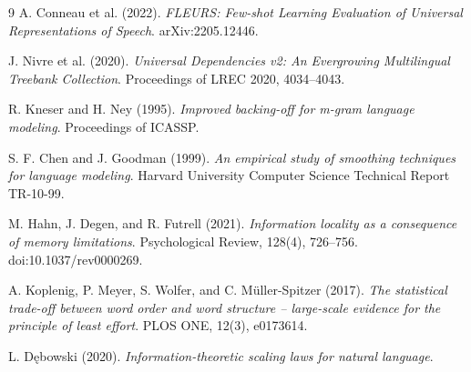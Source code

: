 \documentclass[11pt]{article}
\begin{document}
\begin{thebibliography}{9}
A. Conneau et al. (2022). \textit{FLEURS: Few-shot Learning Evaluation of Universal Representations of Speech}. arXiv:2205.12446.

J. Nivre et al. (2020). \textit{Universal Dependencies v2: An Evergrowing Multilingual Treebank Collection}. Proceedings of LREC 2020, 4034--4043.

R. Kneser and H. Ney (1995). \textit{Improved backing-off for m-gram language modeling}. Proceedings of ICASSP.

S. F. Chen and J. Goodman (1999). \textit{An empirical study of smoothing techniques for language modeling}. Harvard University Computer Science Technical Report TR-10-99.

M. Hahn, J. Degen, and R. Futrell (2021). \textit{Information locality as a consequence of memory limitations}. Psychological Review, 128(4), 726--756. doi:10.1037/rev0000269.

A. Koplenig, P. Meyer, S. Wolfer, and C. Müller-Spitzer (2017). \textit{The statistical trade-off between word order and word structure -- large-scale evidence for the principle of least effort}. PLOS ONE, 12(3), e0173614.

L. Dębowski (2020). \textit{Information-theoretic scaling laws for natural language}.
\end{thebibliography}
\end{document}
